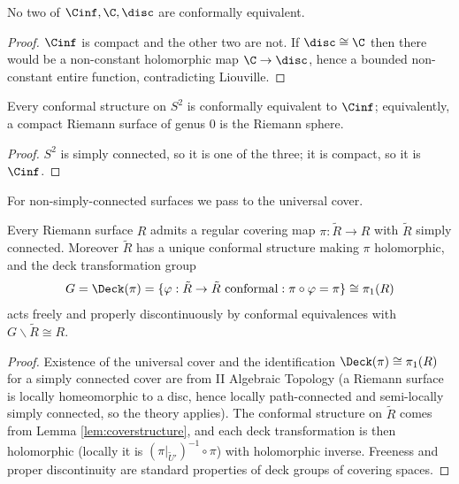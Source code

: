 \begin{proposition}
	No two of $\Cinf, \C, \disc$ are conformally equivalent.
\end{proposition}

\begin{proof}
	$\Cinf$ is compact and the other two are not. If $\disc \cong \C$ then there would be a
	non-constant holomorphic map $\C\to\disc$, hence a bounded non-constant entire function,
	contradicting Liouville.
\end{proof}

\begin{corollary}\label{cor:genus0}
	Every conformal structure on $S^2$ is conformally equivalent to $\Cinf$; equivalently,
	a compact Riemann surface of genus $0$ is the Riemann sphere.
\end{corollary}

\begin{proof}
	$S^2$ is simply connected, so it is one of the three; it is compact, so it is $\Cinf$.
\end{proof}

For non-simply-connected surfaces we pass to the universal cover.

\begin{theorem}\label{thm:universalcover}
	Every Riemann surface $R$ admits a regular covering map $\pi : \tilde R \to R$ with
	$\tilde R$ simply connected. Moreover $\tilde R$ has a unique conformal structure making
	$\pi$ holomorphic, and the deck transformation group
	$$
	G = \Deck(\pi) = \{\varphi : \tilde R \to \tilde R \text{ conformal} : \pi\circ\varphi = \pi\} \cong \pi_1(R)
	$$
	acts freely and properly discontinuously by conformal equivalences with
	$G\backslash \tilde R \cong R$.
\end{theorem}

\begin{proof}
	Existence of the universal cover and the identification $\Deck(\pi)\cong\pi_1(R)$ for a
	simply connected cover are from II Algebraic Topology (a Riemann surface is locally
	homeomorphic to a disc, hence locally path-connected and semi-locally simply connected,
	so the theory applies). The conformal structure on $\tilde R$ comes from Lemma
	\ref{lem:coverstructure}, and each deck transformation is then holomorphic (locally it
	is $(\pi|_{\tilde U'})^{-1}\circ\pi$) with holomorphic inverse. Freeness and proper
	discontinuity are standard properties of deck groups of covering spaces.
\end{proof}

